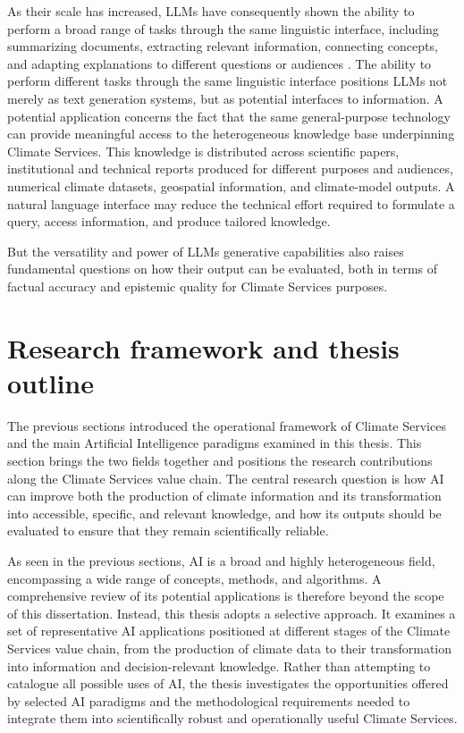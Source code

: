 As their scale has increased, LLMs have consequently shown the ability to perform a broad range of tasks through the same linguistic interface, including summarizing documents, extracting relevant information, connecting concepts, and adapting explanations to different questions or audiences \citep{li_fundamental_2024}. The ability to perform different tasks through the same linguistic interface positions LLMs not merely as text generation systems, but as potential interfaces to information. A potential application concerns the fact that the same general-purpose technology can provide meaningful access to the heterogeneous knowledge base underpinning Climate Services. This knowledge is distributed across scientific papers, institutional and technical reports produced for different purposes and audiences, numerical climate datasets, geospatial information, and climate-model outputs. A natural language interface may reduce the technical effort required to formulate a query, access information, and produce tailored knowledge. 

But the versatility and power of LLMs generative capabilities also raises fundamental questions on how their output can be evaluated, both in terms of factual accuracy and epistemic quality for Climate Services purposes.  


\section{Research framework and thesis outline}

The previous sections introduced the operational framework of Climate Services and the main Artificial Intelligence paradigms examined in this thesis. This section brings the two fields together and positions the research contributions along the Climate Services value chain. The central research question is how AI can improve both the production of climate information and its transformation into accessible, specific, and relevant knowledge, and how its outputs should be evaluated to ensure that they remain scientifically reliable. 

As seen in the previous sections, AI is a broad and highly heterogeneous field, encompassing a wide range of concepts, methods, and algorithms. A comprehensive review of its potential applications is therefore beyond the scope of this dissertation. Instead, this thesis adopts a selective approach. It examines a set of representative AI applications positioned at different stages of the Climate Services value chain, from the production of climate data to their transformation into information and decision-relevant knowledge. Rather than attempting to catalogue all possible uses of AI, the thesis investigates the opportunities offered by selected AI paradigms and the methodological requirements needed to integrate them into scientifically robust and operationally useful Climate Services.

